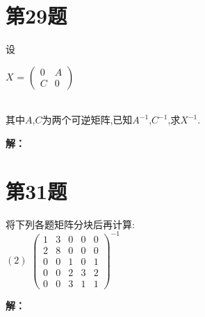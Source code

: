 \documentclass[a4paper, 12pt]{ctexart}
\begin{document}
\section{第29题}
\begin{exercise}
设~\\
\begin{center}
 $X$ = $\begin{pmatrix}
 0 & A\\
 C & 0
\end{pmatrix}$
\end{center}~\\

其中$A$,$C$为两个可逆矩阵,已知$A^{-1}$,$C^{-1}$,求$X^{-1}$.
\end{exercise}
\noindent\textbf{解：}

\section{第31题}
\begin{exercise}
将下列各题矩阵分块后再计算:~\\

$(2)$ $\begin{pmatrix}
 1 & 3 & 0 & 0 & 0\\
 2 & 8 & 0 & 0 & 0\\
 0 & 0 & 1 & 0 & 1\\
 0 & 0 & 2 & 3 & 2\\
 0 & 0 & 3 & 1 & 1
\end{pmatrix}^{-1}$
\end{exercise}
\noindent\textbf{解：}
\end{document}
